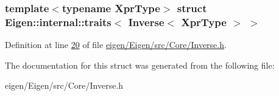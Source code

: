 \subsubsection*{template$<$typename Xpr\+Type$>$\newline
struct Eigen\+::internal\+::traits$<$ Inverse$<$ Xpr\+Type $>$ $>$}



Definition at line \hyperlink{eigen_2_eigen_2src_2_core_2_inverse_8h_source_l00020}{20} of file \hyperlink{eigen_2_eigen_2src_2_core_2_inverse_8h_source}{eigen/\+Eigen/src/\+Core/\+Inverse.\+h}.



The documentation for this struct was generated from the following file\+:\begin{DoxyCompactItemize}
\item 
eigen/\+Eigen/src/\+Core/\+Inverse.\+h\end{DoxyCompactItemize}
